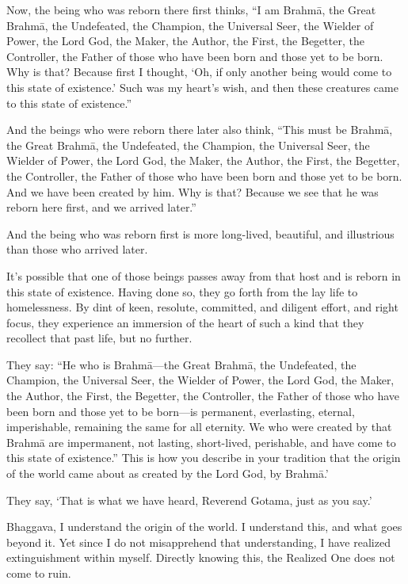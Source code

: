 \documentclass[12pt,openany]{book}%
\begin{document}
Now, the being who was reborn there first thinks, “I am \textsanskrit{Brahmā}, the Great \textsanskrit{Brahmā}, the Undefeated, the Champion, the Universal Seer, the Wielder of Power, the Lord God, the Maker, the Author, the First, the Begetter, the Controller, the Father of those who have been born and those yet to be born. Why is that? Because first I thought, ‘Oh, if only another being would come to this state of existence.’ Such was my heart’s wish, and then these creatures came to this state of existence.” 

And the beings who were reborn there later also think, “This must be \textsanskrit{Brahmā}, the Great \textsanskrit{Brahmā}, the Undefeated, the Champion, the Universal Seer, the Wielder of Power, the Lord God, the Maker, the Author, the First, the Begetter, the Controller, the Father of those who have been born and those yet to be born. And we have been created by him. Why is that? Because we see that he was reborn here first, and we arrived later.” 

And the being who was reborn first is more long-lived, beautiful, and illustrious than those who arrived later. 

It’s possible that one of those beings passes away from that host and is reborn in this state of existence. Having done so, they go forth from the lay life to homelessness. By dint of keen, resolute, committed, and diligent effort, and right focus, they experience an immersion of the heart of such a kind that they recollect that past life, but no further. 

They say: “He who is \textsanskrit{Brahmā}—the Great \textsanskrit{Brahmā}, the Undefeated, the Champion, the Universal Seer, the Wielder of Power, the Lord God, the Maker, the Author, the First, the Begetter, the Controller, the Father of those who have been born and those yet to be born—is permanent, everlasting, eternal, imperishable, remaining the same for all eternity. We who were created by that \textsanskrit{Brahmā} are impermanent, not lasting, short-lived, perishable, and have come to this state of existence.” This is how you describe in your tradition that the origin of the world came about as created by the Lord God, by \textsanskrit{Brahmā}.’ 

They say, ‘That is what we have heard, Reverend Gotama, just as you say.’ 

Bhaggava, I understand the origin of the world. I understand this, and what goes beyond it. Yet since I do not misapprehend that understanding, I have realized extinguishment within myself. Directly knowing this, the Realized One does not come to ruin. 
\end{document}

